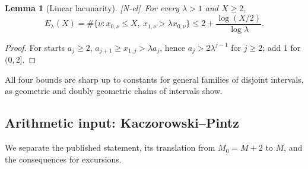 \documentclass[11pt,reqno]{amsart}
\numberwithin{equation}{section}
\theoremstyle{plain}
\newtheorem{lemma}[theorem]{Lemma}
\theoremstyle{definition}
\theoremstyle{remark}
\newcommand{\tagNE}{\textup{[N-el]}}
\begin{document}
\begin{lemma}[Linear lacunarity]
\label{lem:linear-lacunary}
\tagNE\ For every $\lambda>1$ and $X\ge2$,
\begin{equation}
\label{eq:linear-lacunary-count}
E_\lambda(X)=\#\{\nu:x_{0,\nu}\le X,\ x_{1,\nu}>\lambda x_{0,\nu}\}
\le2+\frac{\log(X/2)}{\log\lambda}.
\end{equation}
\end{lemma}

\begin{proof}
For starts $a_j\ge2$, $a_{j+1}\ge x_{1,j}>\lambda a_j$, hence
$a_j>2\lambda^{j-1}$ for $j\ge2$; add $1$ for $(0,2]$.
\end{proof}

All four bounds are sharp up to constants for general families of disjoint
intervals, as geometric and doubly geometric chains of intervals show.

\subsection{Arithmetic input: Kaczorowski--Pintz}

We separate the published statement, its translation from $M_0=M+2$ to
$M$, and the consequences for excursions.
\end{document}
